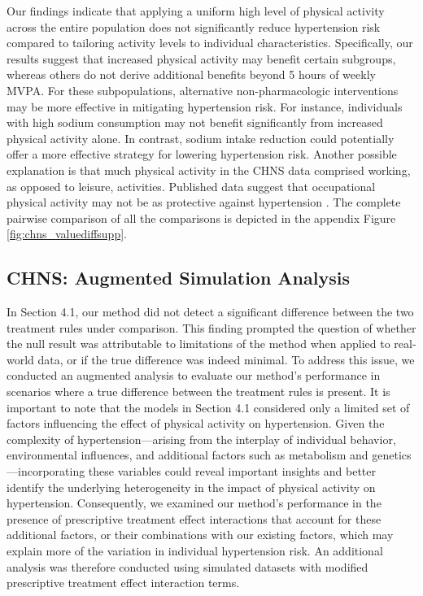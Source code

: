 \documentclass{article}
\begin{document}
Our findings indicate that applying a uniform high level of physical activity across the entire population does not significantly reduce hypertension risk compared to tailoring activity levels to individual characteristics. Specifically, our results suggest that increased physical activity may benefit certain subgroups, whereas others do not derive additional benefits beyond 5 hours of weekly MVPA. For these subpopulations, alternative non-pharmacologic interventions may be more effective in mitigating hypertension risk.  For instance, individuals with high sodium consumption may not benefit significantly from increased physical activity alone. In contrast, sodium intake reduction could potentially offer a more effective strategy for lowering hypertension risk. Another possible explanation is that much physical activity in the CHNS data comprised working, as opposed to leisure, activities. Published data suggest that occupational physical activity may not be as protective against hypertension \cite{huai2013physical}. The complete pairwise comparison of all the comparisons is depicted in the appendix Figure \ref{fig:chns_valuediffsupp}.


\subsection{CHNS: Augmented Simulation Analysis}

In Section 4.1, our method did not detect a significant difference between the two treatment rules under comparison. This finding prompted the question of whether the null result was attributable to limitations of the method when applied to real-world data, or if the true difference was indeed minimal. To address this issue, we conducted an augmented analysis to evaluate our method's performance in scenarios where a true difference between the treatment rules is present. It is important to note that the models in Section 4.1 considered only a limited set of factors influencing the effect of physical activity on hypertension. Given the complexity of hypertension—arising from the interplay of individual behavior, environmental influences, and additional factors such as metabolism and genetics—incorporating these variables could reveal important insights and better identify the underlying heterogeneity in the impact of physical activity on hypertension. Consequently, we examined our method’s performance in the presence of prescriptive treatment effect interactions that account for these additional factors, or their combinations with our existing factors, which may explain more of the variation in individual hypertension risk. An additional analysis was therefore conducted using simulated datasets with modified prescriptive treatment effect interaction terms.  
\end{document}
